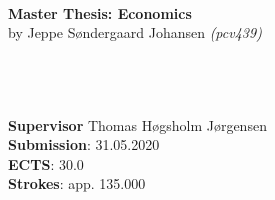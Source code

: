\documentclass[12pt,oneside]{article}
\begin{document}

    \thispagestyle{empty}
    \vspace*{3.75cm}
    \textbf{\large\\ Master Thesis: Economics}\\
    \vspace*{0.1cm}
    by Jeppe Søndergaard Johansen \textit{(pcv439)} \hspace{1.0cm}
    \vspace*{2.75cm}\\
    \textbf{\LARGE } \\
    \vspace*{0.1cm} \\
    \begin{tabbing}
    \\[7.55cm]
    \textbf{Supervisor} Thomas Høgsholm Jørgensen \\
    \textbf{Submission}: 31.05.2020\\
    \textbf{ECTS}: 30.0\\
    \textbf{Strokes}: app. 135.000\\
    \end{tabbing}
    \newpage
    \ClearWallPaper
\end{document}
